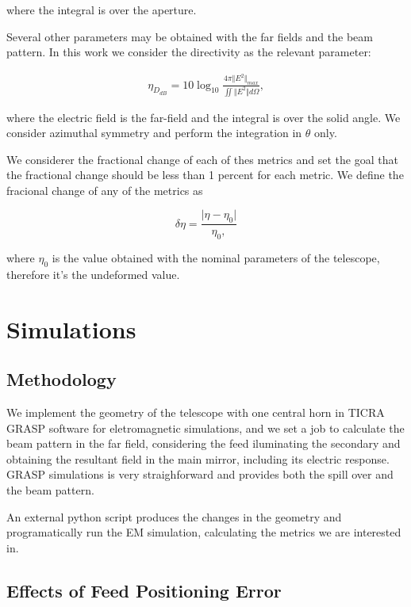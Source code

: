 \documentclass{ws-jai}
\begin{document}
where the integral is over the aperture.

Several other parameters may be obtained with the far fields and the beam pattern. In this work we consider the directivity as the relevant parameter:

\begin{eqnarray}
\eta_{D_{dB}} = 10 \log_{10} \frac{4 \pi \Vert E^2\Vert_{max}}{\iint \Vert E^2\Vert d\Omega},
\end{eqnarray}

where the electric field is the far-field and the integral is over the solid angle. We consider azimuthal symmetry and perform the integration in $\theta$ only.

We considerer the fractional change of each of thes metrics and set the goal that the fractional change should be less than 1 percent for each metric. We define the fracional change of any of the metrics as

\begin{equation}
\delta \eta = \frac{\vert \eta - \eta_0\vert}{\eta_0,}
\end{equation}

where $\eta_0$ is the value obtained with the nominal parameters of the telescope, therefore it's the undeformed value.

\section{Simulations}

\subsection{Methodology}

We implement the geometry of the telescope with one central horn in TICRA GRASP software for eletromagnetic simulations, and we set a job to calculate the beam pattern in the far field, considering the feed iluminating the secondary and obtaining the resultant field in the main mirror, including its electric response. GRASP simulations is very straighforward and provides both the spill over and the beam pattern.

An external python script produces the changes in the geometry and programatically run the EM simulation, calculating the metrics we are interested in.


\subsection{Effects of Feed Positioning Error}
\end{document}
